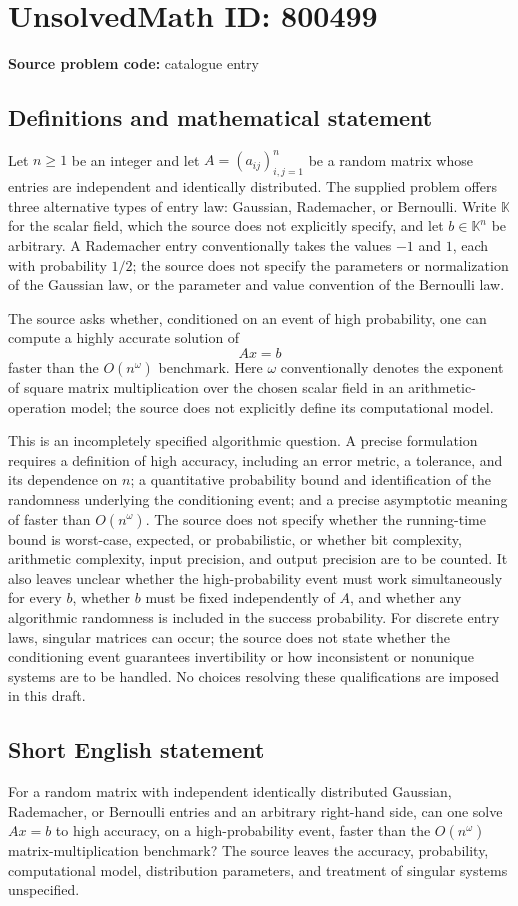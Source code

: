 \documentclass[11pt]{article}
\begin{document}
\section*{UnsolvedMath ID: 800499}
\textbf{Source problem code:} catalogue entry
\subsection{Definitions and mathematical statement}
Let \(n\geq 1\) be an integer and let \(A=(a_{ij})_{i,j=1}^{n}\) be a random matrix whose entries are independent and identically distributed. The supplied problem offers three alternative types of entry law: Gaussian, Rademacher, or Bernoulli. Write \(\mathbb K\) for the scalar field, which the source does not explicitly specify, and let \(b\in\mathbb K^n\) be arbitrary. A Rademacher entry conventionally takes the values \(-1\) and \(1\), each with probability \(1/2\); the source does not specify the parameters or normalization of the Gaussian law, or the parameter and value convention of the Bernoulli law.

The source asks whether, conditioned on an event of high probability, one can compute a highly accurate solution of
\[
Ax=b
\]
faster than the \(O(n^\omega)\) benchmark. Here \(\omega\) conventionally denotes the exponent of square matrix multiplication over the chosen scalar field in an arithmetic-operation model; the source does not explicitly define its computational model.

This is an incompletely specified algorithmic question. A precise formulation requires a definition of high accuracy, including an error metric, a tolerance, and its dependence on \(n\); a quantitative probability bound and identification of the randomness underlying the conditioning event; and a precise asymptotic meaning of faster than \(O(n^\omega)\). The source does not specify whether the running-time bound is worst-case, expected, or probabilistic, or whether bit complexity, arithmetic complexity, input precision, and output precision are to be counted. It also leaves unclear whether the high-probability event must work simultaneously for every \(b\), whether \(b\) must be fixed independently of \(A\), and whether any algorithmic randomness is included in the success probability. For discrete entry laws, singular matrices can occur; the source does not state whether the conditioning event guarantees invertibility or how inconsistent or nonunique systems are to be handled. No choices resolving these qualifications are imposed in this draft.
\subsection{Short English statement}
For a random matrix with independent identically distributed Gaussian, Rademacher, or Bernoulli entries and an arbitrary right-hand side, can one solve \(Ax=b\) to high accuracy, on a high-probability event, faster than the \(O(n^\omega)\) matrix-multiplication benchmark? The source leaves the accuracy, probability, computational model, distribution parameters, and treatment of singular systems unspecified.
\end{document}
